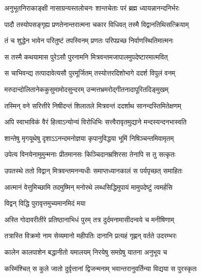 \twolineshloka
{अनुभूतनिराकाङ्क्षी नासाग्रन्यस्तलोचनः}
{शान्तचेताः परं ब्रह्म ध्यायन्नानन्दनिर्भरः} %

\twolineshloka
{पादौ तस्योपसङ्गृह्य प्रणतेनान्तरात्मना}
{चकार विधिवत् तस्मै विद्वानतिथिसत्क्रियाम्} %

\twolineshloka
{तं च शुद्धेन भावेन परितुष्टं तपस्विनम्}
{प्रणतः परिपप्रच्छ निर्वाणस्थितिमात्मनः} %

\twolineshloka
{स तस्मै कथयामास पुरेऽसौ पुरनामनि}
{मित्रवन्तमजापालमुपदेष्टारमात्मवित्} %

\twolineshloka
{स चाभिवन्द्य तत्पादावेत्यसौ पुरमूर्जितम्}
{तस्योत्तरदिशोभागे ददर्श विपुलं वनम्} %

\twolineshloka
{मरुदान्दोलितानेककुसुमामोदसुन्दरम्}
{उन्मत्तभ्रमरोद्गीतनादापूरितदिङ्मुखम्} %

\twolineshloka
{तस्मिन् वने सरित्तीरे निषीदन्तं शिलातले}
{मित्रवन्तं ददर्शाथ सानन्दस्तिमितेक्षणम्} %

\twolineshloka
{अपि स्वाभाविकं वैरं हित्वाऽन्योन्यं विरोधिभिः}
{सत्त्वैरावृतमुद्याने मन्दस्यन्दनभास्वति} %

\twolineshloka
{शान्तेषु मृगयूथेषु दृशाऽऽनन्दमनोज्ञया}
{कृपानुविद्धया भूमिं निषिञ्चन्तमिवामृतम्} %

\twolineshloka
{उपेत्य विनयेनामुमुन्मनाः प्रीतमानसः}
{किञ्चिदानम्रशिरसा तेनापि स तु सत्कृतः} %

\twolineshloka
{उपतस्थे ततो विद्वान् मित्रवन्तमनन्यधीः}
{समाप्तध्यानकालं स पर्यपृच्छत् समाहितः} %


\twolineshloka
{आत्मानं वेत्तुमिच्छामि तदमुष्मिन् मनोरथे}
{लब्धसिद्धिमुपायं मामुपदेष्टुं त्वमर्हसि} %




\onelineshloka
{विद्वन् विद्धि पुरावृत्तमुच्यमानमिदं मया} %

\twolineshloka
{अस्ति गोदावरीतीरे प्रतिष्ठानाभिधं पुरम्}
{तत्र दुर्दमनामासीदन्वये च मनीषिणाम्} %

\twolineshloka
{तत्रास्ति विक्रमो नाम सेव्यमानो महीपतिः}
{दानानि प्रत्यहं गृह्णन् वर्तते उदरम्भरः} %

\twolineshloka
{कालेन कालपाशेन बद्धानीतो यमालयम्}
{निरयेषु समग्रेषु यातना अनुभूय च} %

\twolineshloka
{कस्मिंश्चित् स कुले जातो दुर्वृत्तानां द्विजन्मनाम्}
{भवान्तरानुवर्तिन्या विद्यया स पुरस्कृतः} %

